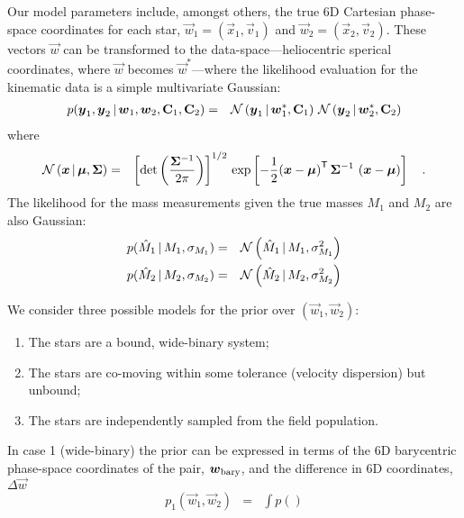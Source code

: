 \documentclass[12pt,letterpaper]{article}
\begin{document}
Our model parameters include, amongst others, the true 6D Cartesian phase-space
coordinates for each star, $\vec{w}_1=(\vec{x}_1, \vec{v}_1)$ and
$\vec{w}_2=(\vec{x}_2, \vec{v}_2)$. These vectors $\vec{w}$ can be transformed to
the data-space---heliocentric sperical coordinates, where $\vec{w}$ becomes
$\vec{w}^*$---where the likelihood evaluation for the kinematic data is a simple
multivariate Gaussian:
\begin{eqnarray}
    p(\vec{y}_1, \vec{y}_2 \given \vec{w}_1, \vec{w}_2, \mat{C}_1, \mat{C}_2)
        &=&
        \norm\left(\vec{y}_1 \given \vec{w}_1^*, \mat{C}_1 \right) \,
        \norm\left(\vec{y}_2 \given \vec{w}_2^*, \mat{C}_2 \right)
\end{eqnarray}
where
\begin{eqnarray}
    \norm\left(\vec{x} \given \vec{\mu}, \mat{\Sigma}\right) &=&
        \left[\det\left(\frac{\mat{\Sigma}^{-1}}{2\pi}\right)\right]^{1/2} \,
          \exp \left[ -\frac{1}{2} \transpose{\left(\vec{x} - \vec{\mu} \right)} \,
          \mat{\Sigma}^{-1} \,
          \left(\vec{x} - \vec{\mu} \right) \right] \quad .
\end{eqnarray}
The likelihood for the mass measurements given the true masses $M_1$ and $M_2$
are also Gaussian:
\begin{eqnarray}
    p(\hat{M}_1 \given M_1, \sigma_{M_1}) &=&
        \norm\left(\hat{M}_1 \given M_1, \sigma_{M_1}^2\right) \\
    p(\hat{M}_2 \given M_2, \sigma_{M_2}) &=&
        \norm\left(\hat{M}_2 \given M_2, \sigma_{M_2}^2\right)
\end{eqnarray}

We consider three possible models for the prior over $(\vec{w}_1, \vec{w}_2)$:
\begin{enumerate}
    \item The stars are a bound, wide-binary system;
    \item The stars are co-moving within some tolerance (velocity dispersion)
    but unbound;
    \item The stars are independently sampled from the field population.
\end{enumerate}
In case 1 (wide-binary) the prior can be expressed in terms of the 6D barycentric phase-space coordinates of the pair, $\vec{w}_{\rm bary}$, and the difference in 6D coordinates, $\Delta\vec{w}$
\begin{eqnarray}
    p_1(\vec{w}_1, \vec{w}_2) &=&
        \int p()
\end{eqnarray}
\end{document}
